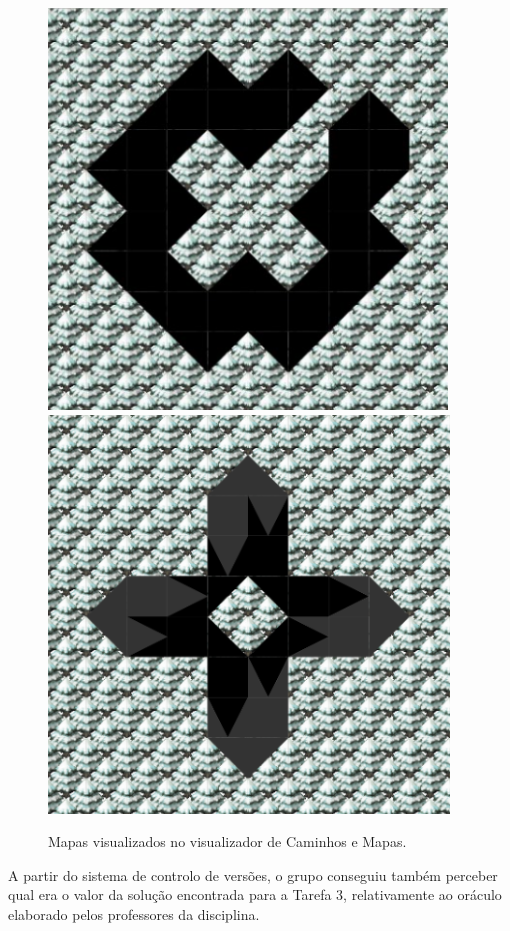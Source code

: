 \documentclass[a4paper]{report} %
\begin{document}
 \begin{figure}[!h]
 \begin{center}
  
  \includegraphics[scale=0.4]{Imagens/mapaDoX.png} \quad
  \includegraphics[scale=0.4]{Imagens/mapaDaCruz.png}
  \caption{Mapas visualizados no visualizador de Caminhos e Mapas.}
 
 \end{center}
 \end{figure}


A partir do sistema de controlo de versões, o grupo conseguiu também perceber qual era o valor da solução encontrada para a Tarefa 3, relativamente ao oráculo elaborado pelos professores da disciplina. 
\end{document}
